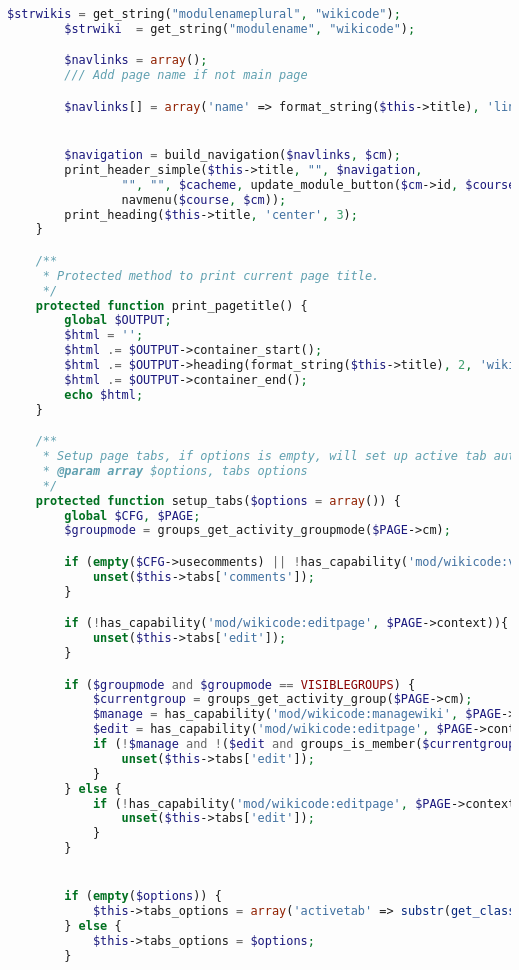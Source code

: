 \begin{lstlisting}[language=PHP]
    	$strwikis = get_string("modulenameplural", "wikicode");
    	$strwiki  = get_string("modulename", "wikicode");

    	$navlinks = array();
		/// Add page name if not main page

        $navlinks[] = array('name' => format_string($this->title), 'link' => '', 'type' => 'title');


    	$navigation = build_navigation($navlinks, $cm);
    	print_header_simple($this->title, "", $navigation,
                "", "", $cacheme, update_module_button($cm->id, $course->id, $strwiki),
                navmenu($course, $cm));
		print_heading($this->title, 'center', 3);
    }

    /**
     * Protected method to print current page title.
     */
    protected function print_pagetitle() {
        global $OUTPUT;
        $html = '';
        $html .= $OUTPUT->container_start();
        $html .= $OUTPUT->heading(format_string($this->title), 2, 'wikicode_headingtitle');
        $html .= $OUTPUT->container_end();
        echo $html;
    }

    /**
     * Setup page tabs, if options is empty, will set up active tab automatically
     * @param array $options, tabs options
     */
    protected function setup_tabs($options = array()) {
        global $CFG, $PAGE;
        $groupmode = groups_get_activity_groupmode($PAGE->cm);

        if (empty($CFG->usecomments) || !has_capability('mod/wikicode:viewcomment', $PAGE->context)){
            unset($this->tabs['comments']);
        }

        if (!has_capability('mod/wikicode:editpage', $PAGE->context)){
            unset($this->tabs['edit']);
        }

        if ($groupmode and $groupmode == VISIBLEGROUPS) {
            $currentgroup = groups_get_activity_group($PAGE->cm);
            $manage = has_capability('mod/wikicode:managewiki', $PAGE->cm->context);
            $edit = has_capability('mod/wikicode:editpage', $PAGE->context);
            if (!$manage and !($edit and groups_is_member($currentgroup))) {
                unset($this->tabs['edit']);
            }
        } else {
            if (!has_capability('mod/wikicode:editpage', $PAGE->context)) {
                unset($this->tabs['edit']);
            }
        }


        if (empty($options)) {
            $this->tabs_options = array('activetab' => substr(get_class($this), 10));
        } else {
            $this->tabs_options = $options;
        }


\end{lstlisting}
